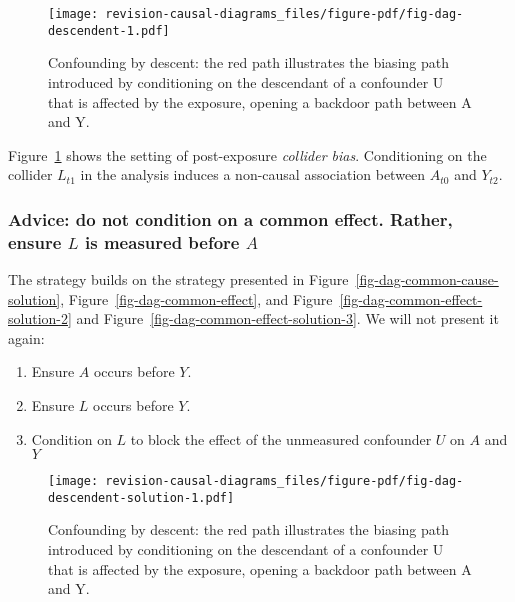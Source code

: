 \documentclass[
  singlecolumn,
  9pt]{article}
\providecommand{\tightlist}{%
  \setlength{\itemsep}{0pt}\setlength{\parskip}{0pt}}\usepackage{longtable,booktabs,array}
\begin{document}
\begin{figure}

{\centering \texttt{[image: revision-causal-diagrams\_files/figure-pdf/fig-dag-descendent-1.pdf]}

}

\caption{\label{fig-dag-descendent}Confounding by descent: the red path
illustrates the biasing path introduced by conditioning on the
descendant of a confounder U that is affected by the exposure, opening a
backdoor path between A and Y.}

\end{figure}

Figure~\ref{fig-dag-descendent} shows the setting of post-exposure
\emph{collider bias}. Conditioning on the collider \(L_{t1}\) in the
analysis induces a non-causal association between \(A_{t0}\) and
\(Y_{t2}\).

\subsubsection{\texorpdfstring{Advice: do not condition on a common
effect. Rather, ensure \(L\) is measured before
\(A\)}{Advice: do not condition on a common effect. Rather, ensure L is measured before A}}\label{advice-do-not-condition-on-a-common-effect.-rather-ensure-l-is-measured-before-a}

The strategy builds on the strategy presented in
Figure~\ref{fig-dag-common-cause-solution},
Figure~\ref{fig-dag-common-effect}, and
Figure~\ref{fig-dag-common-effect-solution-2} and
Figure~\ref{fig-dag-common-effect-solution-3}. We will not present it
again:

\begin{enumerate}
\def\labelenumi{\arabic{enumi}.}
\tightlist
\item
  Ensure \(A\) occurs before \(Y\).
\item
  Ensure \(L\) occurs before \(Y\).
\item
  Condition on \(L\) to block the effect of the unmeasured confounder
  \(U\) on \(A\) and \(Y\)
\end{enumerate}

\begin{figure}

{\centering \texttt{[image: revision-causal-diagrams\_files/figure-pdf/fig-dag-descendent-solution-1.pdf]}

}

\caption{\label{fig-dag-descendent-solution}Confounding by descent: the
red path illustrates the biasing path introduced by conditioning on the
descendant of a confounder U that is affected by the exposure, opening a
backdoor path between A and Y.}

\end{figure}
\end{document}
